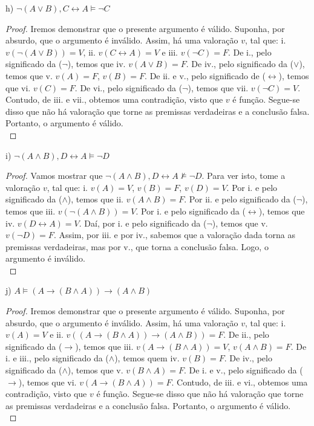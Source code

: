 \documentclass[12pt]{exam}
\begin{document}
\bigskip

h) $\neg(A\lor B), C\leftrightarrow A\vDash \neg C$

\begin{proof}
Iremos demonstrar que o presente argumento é válido. Suponha, por absurdo, que o argumento é inválido. Assim, há uma valoração $v$, tal que:
i. $v(\neg(A\lor B))=V$, 
ii. $v(C\leftrightarrow A)=V$ e 
iii. $v(\neg C)=F$. De i., pelo significado da ($\neg$), temos que iv. $v(A\lor B)=F$. De iv., pelo significado da ($\lor$), temos que v. $v(A)=F$, $v(B)=F$. De ii. e v., pelo significado de ($\leftrightarrow$), temos que vi. $v(C)=F$. De vi., pelo significado da ($\neg$), temos que vii. $v(\neg C)=V$. Contudo, de iii. e vii., obtemos uma contradição, visto que $v$ é função. Segue-se disso que não há valoração que torne as premissas  verdadeiras e a conclusão falsa. Portanto, o argumento é válido.\\
\end{proof}

\bigskip

i) $\neg(A\land B), D\leftrightarrow A\vDash \neg D$

\begin{proof}
Vamos mostrar que $\neg(A\land B), D\leftrightarrow A\nvDash \neg D$. Para ver isto, tome a valoração $v$, tal que: 
i. $v(A)=V$, $v(B)=F$, $v(D)=V$. Por i. e pelo significado da ($\land$), temos que ii. $v(A\land B)=F$. Por ii. e pelo significado da ($\neg$), temos que iii. $v(\neg(A\land B))=V$. Por i. e pelo significado da ($\leftrightarrow$), temos que iv. $v(D\leftrightarrow A)=V$. Daí, por i. e pelo significado da ($\neg$), temos que v. $v(\neg D)=F$. Assim, por iii. e por iv., sabemos que a valoração dada torna as premissas verdadeiras, mas por v., que torna a conclusão falsa. Logo, o argumento é inválido.\\
\end{proof}

\pagebreak

j) $A \vDash (A\rightarrow (B\land A))\rightarrow (A\land B)$

\begin{proof}
Iremos demonstrar que o presente argumento é válido. Suponha, por absurdo, que o argumento é inválido. Assim, há uma valoração $v$, tal que:
i. $v(A)=V$ e 
ii. $v((A\rightarrow (B\land A))\rightarrow (A\land B))=F$. De ii., pelo significado da ($\rightarrow$), temos que iii. $v(A\rightarrow (B\land A))=V$, $v(A\land B)=F$. De i. e iii., pelo significado da ($\land$), temos quem iv. $v(B)=F$. De iv., pelo significado da ($\land$), temos que v. $v(B\land A)=F$. De i. e v., pelo significado da ($\rightarrow$), temos que vi. $v(A\rightarrow (B\land A))=F$. Contudo, de iii. e vi., obtemos uma contradição, visto que $v$ é função. Segue-se disso que não há valoração que torne as premissas verdadeiras e a conclusão falsa. Portanto, o argumento é válido.\\
\end{proof}
\end{document}

